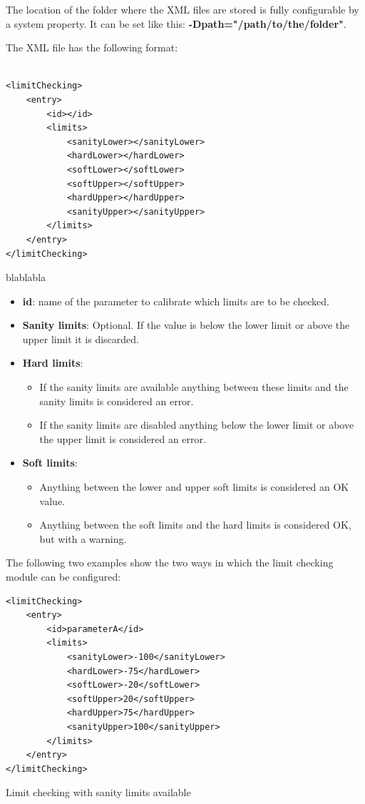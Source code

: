 The location of the folder where the XML files are stored is fully configurable by a system property. It can be set like this: \textbf{-Dpath="/path/to/the/folder"}.

The XML file has the following format:
\begin{table}[H]
\lstset{language=XML}
\begin{lstlisting}

<limitChecking>
	<entry>
		<id></id>
		<limits>
			<sanityLower></sanityLower>
			<hardLower></hardLower>
			<softLower></softLower>
			<softUpper></softUpper>
			<hardUpper></hardUpper>
			<sanityUpper></sanityUpper>
		</limits>
	</entry>
</limitChecking>
\end{lstlisting}
\caption{blablabla}
\label{Table5.x}
\end{table}

\begin{itemize}
\item \textbf{id}: name of the parameter to calibrate which limits are to be checked.
\item \textbf{Sanity limits}: Optional. If the value is below the lower limit or above the upper limit it is discarded. 
\item \textbf{Hard limits}:
	\begin{itemize}
	\item If the sanity limits are available anything between these limits and the sanity limits is considered an error.
	\item If the sanity limits are disabled anything below the lower limit or above the upper limit is considered an error. 
	\end{itemize}
\item \textbf{Soft limits}: 
\begin{itemize}
\item Anything between the lower and upper soft limits is considered an OK value.
\item Anything between the soft limits and the hard limits is considered OK, but with a warning.
\end{itemize}
\end{itemize}

The following two examples show the two ways in which the limit checking module can be configured:

\begin{table}[H]
\lstset{language=XML}
\begin{lstlisting}
<limitChecking>
	<entry>
		<id>parameterA</id>
		<limits>
			<sanityLower>-100</sanityLower>
			<hardLower>-75</hardLower>
			<softLower>-20</softLower>
			<softUpper>20</softUpper>
			<hardUpper>75</hardUpper>
			<sanityUpper>100</sanityUpper>
		</limits>
	</entry>
</limitChecking>
\end{lstlisting}
\caption{Limit checking with sanity limits available}
\label{Table5.x}
\end{table}

